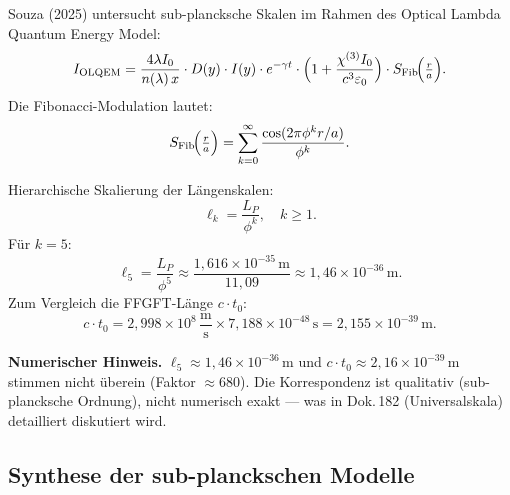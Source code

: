 Souza (2025) \cite{subPlanck2025} untersucht sub-plancksche Skalen im
Rahmen des Optical Lambda Quantum Energy Model:
\begin{equation}
  I_{\text{OLQEM}}
  = \frac{4\lambda I_0}{n(\lambda)\,x} \cdot D(y) \cdot I(y)
    \cdot e^{-\gamma t}
    \cdot \Bigl(1+\frac{\chi^{(3)}I_0}{c^3\varepsilon_0}\Bigr)
    \cdot S_{\text{Fib}}\!\Bigl(\tfrac{r}{a}\Bigr).
\end{equation}
Die Fibonacci-Modulation lautet:
\begin{equation}
  S_{\text{Fib}}\!\Bigl(\tfrac{r}{a}\Bigr)
  = \sum_{k=0}^{\infty} \frac{\cos(2\pi\phi^k r/a)}{\phi^k}.
\end{equation}

Hierarchische Skalierung der Längenskalen:
\begin{equation}
  \ell_k = \frac{L_P}{\phi^k},\quad k \ge 1.
\end{equation}
Für $k=5$:
\begin{equation}
  \ell_5 = \frac{L_P}{\phi^5}
         \approx \frac{1{,}616 \times 10^{-35}\,\text{m}}{11{,}09}
         \approx 1{,}46 \times 10^{-36}\,\text{m}.
\end{equation}
Zum Vergleich die FFGFT-Länge $c\cdot t_0$:
\begin{equation}
  c \cdot t_0
  = 2{,}998 \times 10^8\,\frac{\text{m}}{\text{s}}
    \times 7{,}188 \times 10^{-48}\,\text{s}
  = 2{,}155 \times 10^{-39}\,\text{m}.
\end{equation}

\begin{warnbox}
\textbf{Numerischer Hinweis.}
$\ell_5 \approx 1{,}46 \times 10^{-36}\,\text{m}$ und
$c\cdot t_0 \approx 2{,}16 \times 10^{-39}\,\text{m}$
stimmen nicht überein (Faktor $\approx 680$).
Die Korrespondenz ist qualitativ (sub-plancksche Ordnung), nicht numerisch
exakt — was in Dok.\,182 (Universalskala) detailliert diskutiert wird.
\end{warnbox}

\subsection{Synthese der sub-planckschen Modelle}

\begin{table}[H]
\centering
\caption{Vergleich sub-planckscher Modelle}
\smallskip
{}
\end{table}

